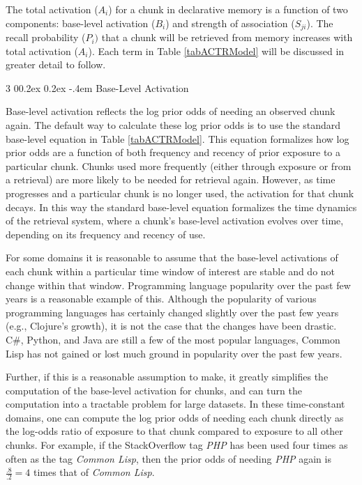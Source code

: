 \documentclass[man,floatsintext,donotrepeattitle]{apa6}
\makeatletter
\renewcommand{\subsubsection}{%
  \@startsection
  {subsubsection}%
  {3}%
  {\parindent}%
  {0\baselineskip \@plus 0.2ex \@minus 0.2ex}%
  {-.4em}%
  {\normalfont\normalsize\bfseries\addperi}}
\makeatother
\begin{document}
The total activation ($A_{i}$) for a chunk in declarative memory is a function of two components: base-level activation ($B_{i}$) and strength of association ($S_{ji}$).
The recall probability ($P_{i})$ that a chunk will be retrieved from memory increases with total activation ($A_{i}$).
Each term in Table \ref{tabACTRModel} will be discussed in greater detail to follow.

\subsubsection{Base-Level Activation}

Base-level activation reflects the log prior odds of needing an observed chunk again.
The default way to calculate these log prior odds is to use the standard base-level equation in Table \ref{tabACTRModel}.
This equation formalizes how log prior odds are a function of both frequency and recency of prior exposure to a particular chunk.
Chunks used more frequently (either through exposure or from a retrieval) are more likely to be needed for retrieval again.
However, as time progresses and a particular chunk is no longer used, the activation for that chunk decays.
In this way the standard base-level equation formalizes the time dynamics of the retrieval system, where a chunk's base-level activation evolves over time, depending on its frequency and recency of use.

For some domains it is reasonable to assume that the base-level activations of each chunk within a particular time window of interest are stable and do not change within that window.
Programming language popularity over the past few years is a reasonable example of this.
Although the popularity of various programming languages has certainly changed slightly over the past few years (e.g., Clojure's growth), it is not the case that the changes have been drastic.
C\#, Python, and Java are still a few of the most popular languages, Common Lisp has not gained or lost much ground in popularity over the past few years.

Further, if this is a reasonable assumption to make, it greatly simplifies the computation of the base-level activation for chunks, and can turn the computation into a tractable problem for large datasets.
In these time-constant domains, one can compute the log prior odds of needing each chunk directly as the log-odds ratio of exposure to that chunk compared to exposure to all other chunks.
For example, if the StackOverflow tag \emph{PHP} has been used four times as often as the tag \emph{Common Lisp}, then the prior odds of needing \emph{PHP} again is $\frac{.8}{.2}=4$ times that of \emph{Common Lisp}.
\end{document}
